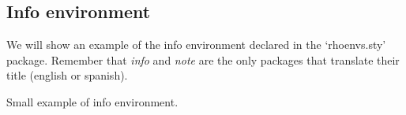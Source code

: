 \documentclass[9pt,a4paper,twoside]{rho-class/rho}
\begin{document}
    \subsection{Info environment}

        We will show an example of the info environment declared in the ‘rhoenvs.sty’ package. Remember that \textit{info} and \textit{note} are the only packages that translate their title (english or spanish).

        \begin{info}
            Small example of info environment.
        \end{info}
        

\printbibliography

\end{document}
